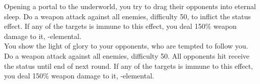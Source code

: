 \begin{tabjob}
         Opening a portal to the underworld, you try to drag their opponents into eternal sleep. Do a weapon attack against all enemies, difficulty 50, to inflict the  status effect. If any of the targets is immune to this effect, you deal 150\% weapon damage to it, -elemental. \\
        
         You show the light of glory to your opponents, who are tempted to follow you. Do a weapon attack against all enemies, difficulty 50. All opponents hit receive the  status until end of next round. If any of the targets is immune to this effect, you deal 150\% weapon damage to it, -elemental. \\

\end{tabjob}
\begin{center}
\end{center}
